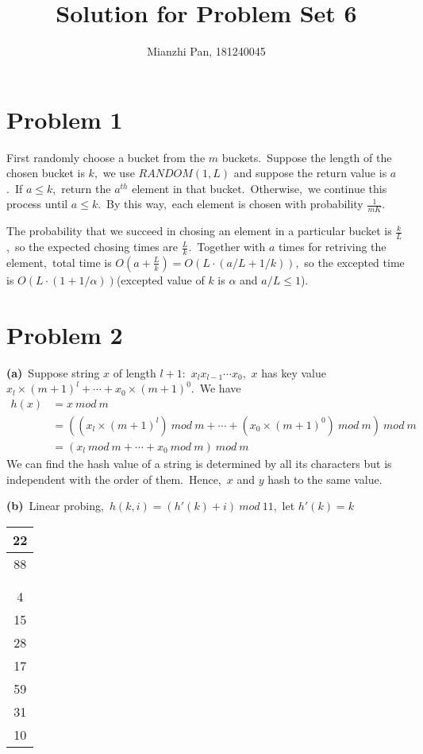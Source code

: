 \documentclass[]{article}
\title{Solution for Problem Set 6}
\author{Mianzhi Pan, 181240045}
\begin{document}
	\maketitle
	\section{Problem 1}
	First randomly choose a bucket from the $m$ buckets.\ Suppose the length of the chosen bucket is $k$,\ we use $RANDOM(1, L)$ and suppose the return value is $a$.\ If $a \leq k$,\ return the $a^{th}$ element in that bucket.\ Otherwise,\ we continue this process until $a \leq k$.\ By this way,\ each element is chosen with probability $\frac{1}{mK}$.
	
	The probability that we succeed in chosing an element in a particular bucket is $\frac{k}{L}$,\ so the expected chosing times are $\frac{L}{k}$.\ Together with $a$ times for retriving the element,\ total time is $O(a + \frac{L}{k}) = O(L\cdot (a/L + 1/k))$,\ so the excepted time is $O(L\cdot (1 + 1/\alpha))$(excepted value of $k$ is $\alpha$ and $a/L \leq 1$).
	
	\section{Problem 2}
	\textbf{(a)}\ Suppose string $x$ of length $l+1$:\ $x_lx_{l-1}\cdots x_0$,\ $x$ has key value $x_l\times (m+1)^l + \cdots + x_0\times (m+1)^0$.\ We have
	\begin{equation*}
	\begin{aligned}
	h(x) &= x\ mod\ m\\
	& = ((x_l\times (m+1)^l)\ mod\ m + \cdots + (x_0\times (m+1)^0)\ mod\ m)\ mod\ m\\
	& = (x_l\ mod\ m + \cdots + x_0\ mod\ m)\ mod\ m
	\end{aligned}
	\end{equation*}
	We can find the hash value of a string is determined by all its characters but is independent with the order of them.\ Hence,\ $x$ and $y$ hash to the same value.
	
	\textbf{(b)}\ Linear probing,\ $h(k,i) = (h'(k) + i)\ mod\ 11$,\ let $h'(k) = k$
	
	\begin{tabular}{|c|}
		\hline
		22\\
		\hline
		88\\
		\hline
		\\
		\hline
		\\
		\hline
		4\\
		\hline
		15\\
		\hline
		28\\
		\hline
		17\\
		\hline
		59\\
		\hline
		31\\
		\hline
		10\\
		\hline
	\end{tabular}
\end{document}
